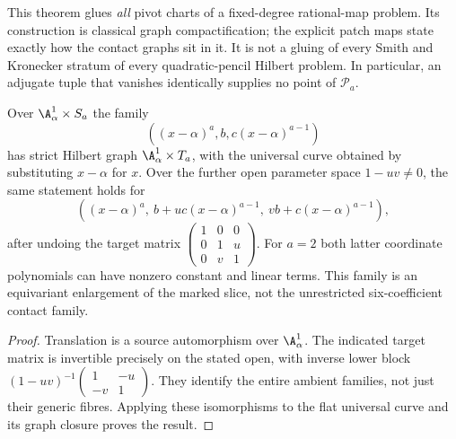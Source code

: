 This theorem glues \emph{all} pivot charts of a fixed-degree rational-map
problem. Its construction is classical graph compactification; the
explicit patch maps state exactly how the contact graphs sit in it.
It is not a gluing of every Smith and Kronecker stratum of every
quadratic-pencil Hilbert problem. In particular, an adjugate tuple that
vanishes identically supplies no point of $\mathcal P_a$.

\begin{corollary}
\label{cor:moving-v169}
Over $\A^1_\alpha\times S_a$ the family
\[
 ((x-\alpha)^a,b,c(x-\alpha)^{a-1})
\]
has strict Hilbert graph $\A^1_\alpha\times T_a$, with the universal
curve obtained by substituting $x-\alpha$ for $x$. Over the further
open parameter space $1-uv\ne0$, the same statement holds for
\begin{equation}\label{eq:mixed-family-v169}
 ((x-\alpha)^a,\ b+uc(x-\alpha)^{a-1},\ vb+c(x-\alpha)^{a-1}),
\end{equation}
after undoing the target matrix
$\left(\begin{smallmatrix}1&0&0\\0&1&u\\0&v&1\end{smallmatrix}\right)$.
For $a=2$ both latter coordinate polynomials can have nonzero constant
and linear terms. This family is an equivariant enlargement of the
marked slice, not the unrestricted six-coefficient contact family.
\end{corollary}
\begin{proof}
Translation is a source automorphism over $\A^1_\alpha$. The indicated
target matrix is invertible precisely on the stated open, with inverse
lower block $(1-uv)^{-1}\left(\begin{smallmatrix}1&-u\\-v&1\end{smallmatrix}\right)$.
They identify the entire ambient families, not just their generic
fibres. Applying these isomorphisms to the flat universal curve and
its graph closure proves the result.
\end{proof}


